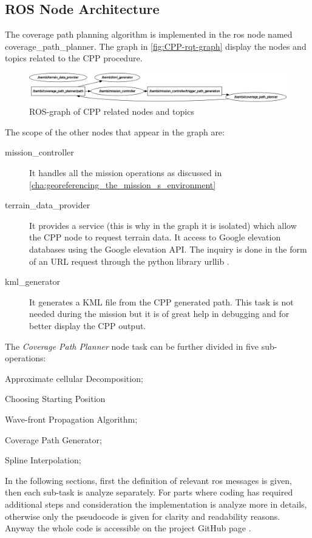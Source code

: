 \subsection{ROS Node Architecture} %
\label{sub:ros_node_architecture}
The coverage path planning algorithm is implemented in the \acrshort{ros} node named \textsf{coverage\_path\_planner}. The graph in \autoref{fig:CPP-rqt-graph} display the nodes and topics related to the CPP procedure.
\begin{figure}[ht]
    \centering
    \includegraphics[width=1\textwidth]{figures/C3/CPP-rqt-graph.png}
    \caption{ROS-graph of CPP related nodes and topics}
    \label{fig:CPP-rqt-graph}
\end{figure}
The scope of the other nodes that appear in the graph are:
\begin{description}
	\item[\textsf{mission\_controller}] It handles all the mission operations as discussed in \autoref{cha:georeferencing_the_mission_s_environment}
	\item[\textsf{terrain\_data\_provider}] It provides a service (this is why in the graph it is isolated) which allow the CPP node to request terrain data. It access to Google elevation databases using the Google elevation API. The inquiry is done in the form of an URL request through the python library \textsf{urllib} \cite{urllib}. 
	\item[\textsf{kml\_generator}] It generates a KML file from the CPP generated path. This task is not needed during the mission but it is of great help in debugging and for better display the CPP output.
\end{description}
The \textit{Coverage Path Planner} node task can be further divided in five sub-operations:
\begin{enumerate*}[label={(\arabic*)}]
	\item Approximate cellular Decomposition;
	\item Choosing Starting Position
	\item Wave-front Propagation Algorithm;
	\item Coverage Path Generator;
	\item Spline Interpolation;
\end{enumerate*}
 In the following sections, first the definition of relevant \acrshort{ros} messages is given, then each sub-task is analyze separately. For parts where coding has required additional steps and consideration the implementation is analyze more in details, otherwise only the pseudocode is given for clarity and readability reasons. Anyway the whole code is accessible on the project GitHub page \cite{bambiProjectGit}.
